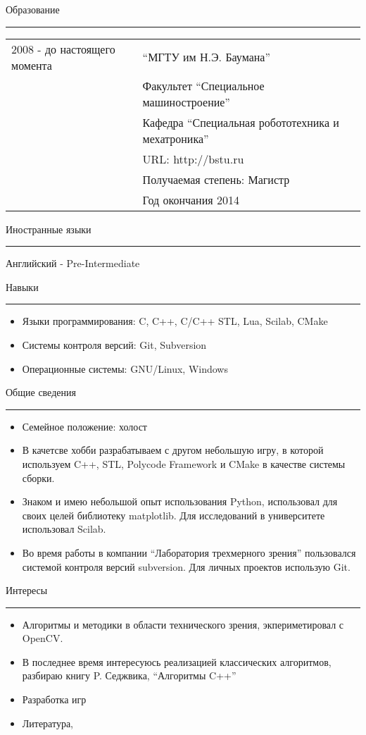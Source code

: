 \documentclass{article}
\begin{document}
{\large Образование} \rule{0pt}{1cm}

\hrule \smallskip
    \begin{tabular}{p{25mm}|p{110mm}}
    2008 - до настоящего момента 
        & ``МГТУ им Н.Э. Баумана'' \\ 
        & Факультет ``Специальное машиностроение'' \\
        & Кафедра ``Специальная робототехника и мехатроника'' \\
        & URL: http://bstu.ru \\
        & Получаемая степень: Магистр \\
        & Год окончания 2014
    \end{tabular}

{\large Иностранные языки} \rule{0pt}{1cm}
\hrule \smallskip
Английский - Pre-Intermediate

{\large{Навыки}} \rule{0pt}{1cm}

\hrule \smallskip
\begin{itemize}
    \item Языки программирования:   C, C++, C/C++ STL, Lua, Scilab, CMake
    \item Системы контроля версий:  Git, Subversion
    \item Операционные системы:     GNU/Linux, Windows
\end{itemize}

{\large{Общие сведения}} \rule{0pt}{1cm}
\hrule \smallskip
\begin{itemize}
    \item Семейное положение: холост
    \item В качетсве хобби разрабатываем с другом небольшую игру, в которой
        используем C++, STL, Polycode Framework и CMake в качестве системы сборки.
    \item Знаком и имею небольшой опыт использования Python, использовал для своих целей
        библиотеку matplotlib. Для исследований в университете использовал Scilab.
    \item Во время работы в компании ``Лаборатория трехмерного зрения'' пользовался системой
        контроля версий subversion. Для личных проектов использую Git.
\end{itemize}

\rule{0pt}{1cm}
{\large{Интересы}}
\hrule \smallskip
\begin{itemize}
    \item Алгоритмы и методики в области технического зрения, экпериметировал с OpenCV.
    \item В последнее время интересуюсь реализацией классических алгоритмов,
        разбираю книгу P. Седжвика, ``Алгоритмы C++''
    \item Разработка игр 
    \item Литература, 
\end{itemize}
\end{document}
